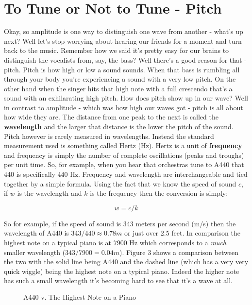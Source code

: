 \documentclass[12pt,a6paper]{book}
\begin{document}
\section{To Tune or Not to Tune - Pitch}
Okay, so amplitude is one way to distinguish one wave from another - what's up next? Well let's stop worrying about hearing our friends for a moment and turn back to the music. Remember how we said it's pretty easy for our brains to distinguish the vocalists from, say, the bass? Well there's a good reason for that - pitch. Pitch is how high or low a sound sounds. When that bass is rumbling all through your body you're experiencing a sound with a very low pitch. On the other hand when the singer hits that high note with a full crescendo that's a sound with an exhilarating high pitch. How does pitch show up in our wave? Well in contrast to amplitude - which was how high our waves got - pitch is all about how wide they are. The distance from one peak to the next is called the \textbf{wavelength} and the larger that distance is the lower the pitch of the sound. Pitch however is rarely measured in wavelengths. Instead the standard measurement used is something called Hertz (Hz). Hertz is a unit of \textbf{frequency} and frequency is simply the number of complete oscillations (peaks and troughs) per unit time. So, for example, when you hear that orchestras tune to A440 that 440 is specifically 440 Hz. Frequency and wavelength are interchangeable and tied together by a simple formula. Using the fact that we know the speed of sound $c$, if $w$ is the wavelength and $k$ is the frequency then the conversion is simply:

\begin{equation}
w = c/k
\end{equation}

So for example, if the speed of sound is 343 meters per second (m/s) then the wavelength of A440 is $343/440\approx0.78m$ or just over 2.5 feet. In comparison the highest note on a typical piano is at 7900 Hz \cite{wikipiano} which corresponds to a \textit{much} smaller wavelength ($343/7900=0.04m$). Figure 3 shows a comparison between the two with the solid line being A440 and the dashed line (which has a very very quick wiggle) being the highest note on a typical piano. Indeed the higher note has such a small wavelength it's becoming hard to see that it's a wave at all.

\begin{figure}[!htb]
\caption{\label{fig:my-label} A440 v. The Highest Note on a Piano}
\end{figure}
\end{document}
